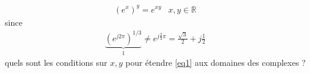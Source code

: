 \documentclass[a4paper]{article}
\title{}
\author{Johan Boissard}
\date\today
\begin{document}
\begin{eqnarray}
	\label{eq1} 
	(e^{x})^y=e^{xy}&x,y\in\mathbb R
\end{eqnarray}
since
\begin{eqnarray}
	\underbrace{(e^{j2\pi})^{1/3}}_{1}\neq e^{j\frac{2}{3}\pi}=\frac{\sqrt{3}}{2}+j\frac{1}{2}
\end{eqnarray}
quels sont les conditions sur $x, y$ pour étendre \ref{eq1} aux domaines des complexes ?
\end{document}
